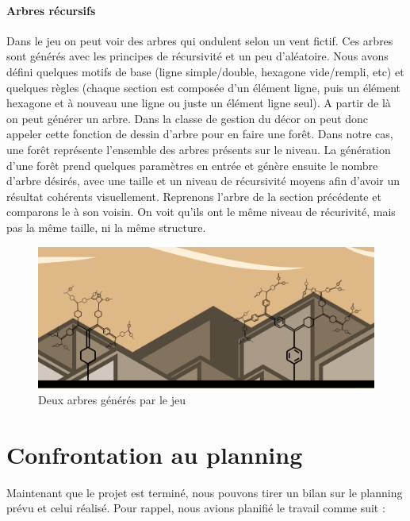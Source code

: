 \documentclass[a4paper,10pt]{article}
\begin{document}
  \paragraph{Arbres récursifs}
  Dans le jeu on peut voir des arbres qui ondulent selon un vent fictif. Ces arbres sont générés avec les principes de récursivité et un peu d'aléatoire. Nous avons défini quelques motifs de base (ligne simple/double, hexagone vide/rempli, etc) et quelques règles (chaque section est composée d'un élément ligne, puis un élément hexagone et à nouveau une ligne ou juste un élément ligne seul). A partir de là on peut générer un arbre. 
Dans la classe de gestion du décor on peut donc appeler cette fonction de dessin d'arbre pour en faire une forêt. Dans notre cas, une forêt représente l'ensemble des arbres présents sur le niveau. La génération d'une forêt prend quelques paramètres en entrée et génère ensuite le nombre d'arbre désirés, avec une taille et un niveau de récursivité moyens afin d'avoir un résultat cohérents visuellement.
  \newline Reprenons l'arbre de la section précédente et comparons le à son voisin. On voit qu'ils ont le même niveau de récurivité, mais pas la même taille, ni la même structure.
 \begin{figure}[!h]
 \centering
 \vspace{-10pt}
 \includegraphics[scale=0.22]{images/trees}
 \caption{Deux arbres générés par le jeu}
 \end{figure}
  
  \pagebreak 
  \section{Confrontation au planning}
  Maintenant que le projet est terminé, nous pouvons tirer un bilan sur le planning prévu et celui réalisé. Pour rappel, nous avions planifié le travail comme suit :
\end{document}
